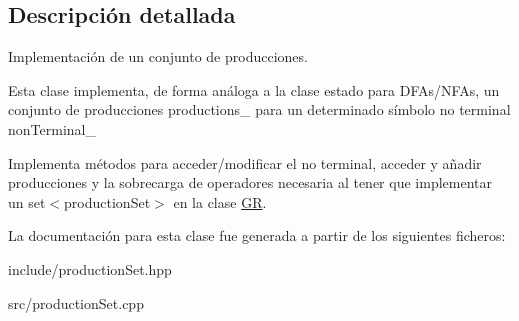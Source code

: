 \subsection{Descripción detallada}
Implementación de un conjunto de producciones. 

Esta clase implementa, de forma análoga a la clase estado para D\+F\+As/\+N\+F\+As, un conjunto de producciones productions\+\_\+ para un determinado símbolo no terminal non\+Terminal\+\_\+

Implementa métodos para acceder/modificar el no terminal, acceder y añadir producciones y la sobrecarga de operadores necesaria al tener que implementar un set$<$production\+Set$>$ en la clase \mbox{\hyperlink{class_g_r}{GR}}. 

La documentación para esta clase fue generada a partir de los siguientes ficheros\+:\begin{DoxyCompactItemize}
\item 
include/production\+Set.\+hpp\item 
src/production\+Set.\+cpp\end{DoxyCompactItemize}

